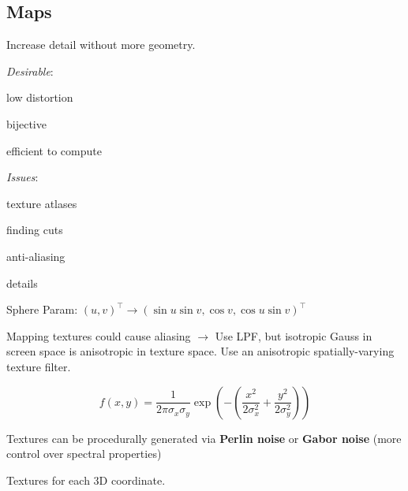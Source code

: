 \subsection{Maps}

\begin{definition}
  Increase detail without more geometry.

  \textit{Desirable}:
  \begin{itemize*}
    \item low distortion
    \item bijective
    \item efficient to compute
  \end{itemize*}

  \textit{Issues}:
  \begin{itemize*}
    \item texture atlases
    \item finding cuts
    \item anti-aliasing
    \item details
  \end{itemize*}
\end{definition}

\begin{theorem}
  Sphere Param:
  \((u, v)^\top \to (\sin u \sin v, \cos v, \cos u \sin v)^\top\)
\end{theorem}

\begin{theorem}
  Mapping textures could cause aliasing \(\to\)
  Use LPF, but isotropic Gauss in screen space is anisotropic in texture space.
  Use an anisotropic spatially-varying texture filter.
\end{theorem}

\begin{definition}
  \[f(x, y) = \frac{1}{2 \pi \sigma_x \sigma_y}\exp\left(- \left(\frac{x^2}{2 \sigma^2_x} + \frac{y^2}{2 \sigma_y^2}\right)\right)\]
\end{definition}

\begin{theorem}
  Textures can be procedurally generated via \textbf{Perlin noise} or \textbf{Gabor noise} (more control over spectral properties)
\end{theorem}

\begin{definition}
  Textures for each 3D coordinate.
\end{definition}

